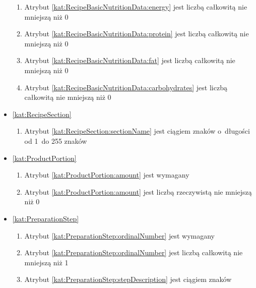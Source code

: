 \begin{itemize}[label={\textbf{Ograniczenia dla}}, wide, labelwidth=!, labelindent=0pt]
\begin{enumerate}[label={\textbf{OGR/2/\protect\twodigits{\arabic{enumi}}}}, wide, labelwidth=!, align=left, leftmargin=3cm, resume]
        \item Atrybut \ref{kat:RecipeBasicNutritionData:energy} jest liczbą całkowitą nie mniejszą niż 0
        \item Atrybut \ref{kat:RecipeBasicNutritionData:protein} jest liczbą całkowitą nie mniejszą niż 0
        \item Atrybut \ref{kat:RecipeBasicNutritionData:fat} jest liczbą całkowitą nie mniejszą niż 0
        \item Atrybut \ref{kat:RecipeBasicNutritionData:carbohydrates} jest liczbą całkowitą nie mniejszą niż 0
    \end{enumerate}

    \item\ref{kat:RecipeSection}\mynobreakpar
    \begin{enumerate}[label={\textbf{OGR/2/\protect\twodigits{\arabic{enumi}}}}, wide, labelwidth=!, align=left, leftmargin=3cm, resume]
        \item Atrybut \ref{kat:RecipeSection:sectionName} jest ciągiem znaków o~długości od 1~do 255 znaków
    \end{enumerate}

    \item\ref{kat:ProductPortion}\mynobreakpar
    \begin{enumerate}[label={\textbf{OGR/2/\protect\twodigits{\arabic{enumi}}}}, wide, labelwidth=!, align=left, leftmargin=3cm, resume]
        \item Atrybut \ref{kat:ProductPortion:amount} jest wymagany

        \item Atrybut \ref{kat:ProductPortion:amount} jest liczbą rzeczywistą nie mniejszą niż 0
    \end{enumerate}

    \item\ref{kat:PreparationStep}\mynobreakpar
    \begin{enumerate}[label={\textbf{OGR/2/\protect\twodigits{\arabic{enumi}}}}, wide, labelwidth=!, align=left, leftmargin=3cm, resume]
        \item Atrybut \ref{kat:PreparationStep:ordinalNumber} jest wymagany

        \item Atrybut \ref{kat:PreparationStep:ordinalNumber} jest liczbą całkowitą nie mniejszą niż 1
        \item Atrybut \ref{kat:PreparationStep:stepDescription} jest ciągiem znaków
    \end{enumerate}


\end{itemize}
